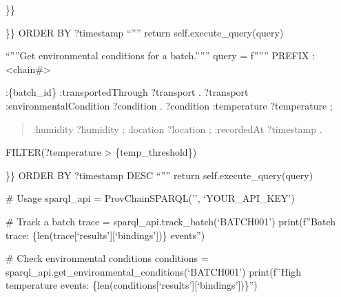 \documentclass[letterpaper,10pt,english]{sphinxmanual}
\begin{document}
\begin{description}
\begin{description}
\begin{description}
\sphinxAtStartPar
\}\}

\end{description}

\sphinxAtStartPar
\}\}
ORDER BY ?timestamp
“””
return self.execute\_query(query)

\sphinxAtStartPar
“””Get environmental conditions for a batch.”””
query = f”””
PREFIX : \textless{}\sphinxhyphen{}chain\#\textgreater{}
\begin{description}
\sphinxAtStartPar
:\{batch\_id\} :transportedThrough ?transport .
?transport :environmentalCondition ?condition .
?condition :temperature ?temperature ;
\begin{quote}

\sphinxAtStartPar
:humidity ?humidity ;
:location ?location ;
:recordedAt ?timestamp .
\end{quote}

\sphinxAtStartPar
FILTER(?temperature \textgreater{} \{temp\_threshold\})

\end{description}

\sphinxAtStartPar
\}\}
ORDER BY ?timestamp DESC
“””
return self.execute\_query(query)

\end{description}

\end{description}

\sphinxAtStartPar
\# Usage
sparql\_api = ProvChainSPARQL(’’, ‘YOUR\_API\_KEY’)

\sphinxAtStartPar
\# Track a batch
trace = sparql\_api.track\_batch(‘BATCH\sphinxhyphen{}001’)
print(f”Batch trace: \{len(trace{[}‘results’{]}{[}‘bindings’{]})\} events”)

\sphinxAtStartPar
\# Check environmental conditions
conditions = sparql\_api.get\_environmental\_conditions(‘BATCH\sphinxhyphen{}001’)
print(f”High temperature events: \{len(conditions{[}‘results’{]}{[}‘bindings’{]})\}”)
{\color{red}\bfseries{}\textasciigrave{}\textasciigrave{}}{\color{red}\bfseries{}\textasciigrave{}}
\end{document}
